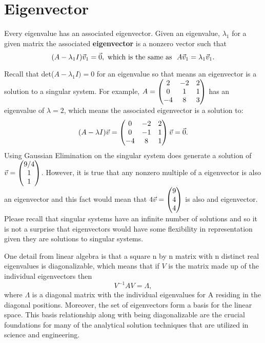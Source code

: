 \documentclass[twoside]{article}
\def\ds{\displaystyle}
\begin{document}
\section{Eigenvector}
Every eigenvalue has an associated eigenvector. 
 Given an eigenvalue, $\ds \lambda_1$ for a given matrix the associated {\bf eigenvector} is a nonzero vector such that 
$$(A-\lambda_1 I) \vec v_1 = \vec 0, \ {\rm which \ is \ the \ same \ as} \ \ A\vec v_1 = \lambda_1 \vec v_1.$$

Recall that det($A - \lambda_1 I)=0$ for an eigenvalue so that means an eigenvector is a solution to a singular system. For example, $\ds A = \begin{pmatrix} 2 & -2 & 2 \cr 0 & 1 & 1 \cr -4 & 8 & 3\end{pmatrix}$ has an eigenvalue of $\ds \lambda = 2$, which means the associated eigenvector is a solution to:
$$(A-\lambda I)\vec v = \begin{pmatrix}  0 & -2 & 2 \cr 0 & -1 & 1 \cr -4 & 8 & 1\end{pmatrix} \vec v = \vec 0.$$
Using Gaussian Elimination on the singular system does generate a solution of $\ds \vec v = \begin{pmatrix}9/4 \cr 1 \cr 1 \end{pmatrix}$. However, it is true that any nonzero multiple of a eigenvector is also an eigenvector and this fact would mean that $\ds 4 \vec v = \begin{pmatrix}9 \cr 4 \cr 4 \end{pmatrix}$ is also and eigenvector. Please recall that singular systems have an infinite number of solutions and so it is not a surprise that eigenvectors would have some flexibility in representation given they are solutions to singular systems. 

One detail from linear algebra is that a square n by n matrix with n distinct real eigenvalues is diagonalizable, which means that if $V$ is the matrix made up of the individual eigenvectors then 
$$V^{-1}AV = \Lambda ,$$
where $\Lambda$ is a diagonal matrix with the individual eigenvalues for A residing in the diagonal positions. Moreover, the set of eigenvectors form a basis for the linear space. This basis relationship along with being diagonalizable are the crucial foundations for many of the analytical solution techniques that are utilized in science and engineering. 
\end{document}
